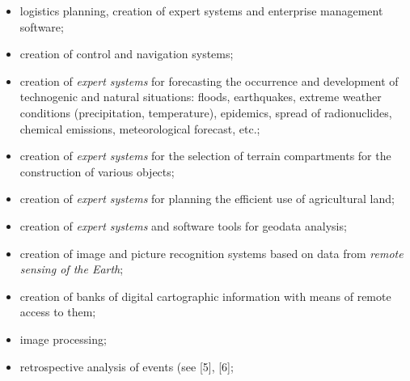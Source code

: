 \documentclass{article}
\begin{document}
\begin{multicols}{2}
\begin{itemize}
    \item logistics planning, creation of expert systems and
enterprise management software;
    \item creation of control and navigation systems;
    \item creation of \textit{expert systems} for forecasting the occurrence and development of technogenic and natural situations: floods, earthquakes, extreme weather conditions (precipitation, temperature), epidemics, spread of radionuclides, chemical emissions, meteorological forecast, etc.;
    \item creation of \textit{expert systems} for the selection of terrain compartments for the construction of various objects;
    \item creation of \textit{expert systems} for planning the efficient use of agricultural land;
    \item creation of \textit{expert systems} and software tools for geodata analysis;
    \item creation of image and picture recognition systems based on data from \textit{remote sensing of the Earth};
    \item creation of banks of digital cartographic information with means of remote access to them;
    \item image processing;
    \item retrospective analysis of events (see [5], [6];   
\end{itemize}
\end{multicols}
\end{document}
